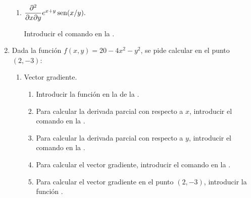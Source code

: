 \begin{enumerate}[leftmargin=*]
\begin{enumerate}
      \item  $\dfrac{\partial ^{2}}{\partial x\partial y}e^{x+y}\operatorname{sen}(x/y).$
            \begin{indication}
            Introducir el comando  en la .
            \end{indication}
      \end{enumerate}

\item Dada la función $f(x,y)=20-4x^2-y^2$, se pide calcular en el punto $(2,-3)$:
      \begin{enumerate}
      \item Vector gradiente.
            \begin{indication}
            \begin{enumerate}
            \item Introducir la función  en la  de la .
            \item Para calcular la derivada parcial con respecto a $x$, introducir el comando  en la .
            \item Para calcular la derivada parcial con respecto a $y$, introducir el comando  en la .
            \item Para calcular el vector gradiente, introducir el comando  en la .
            \item Para calcular el vector gradiente en el punto $(2,-3)$, introducir la función .
            \end{enumerate}
            \end{indication}


\end{enumerate}
\end{enumerate}
